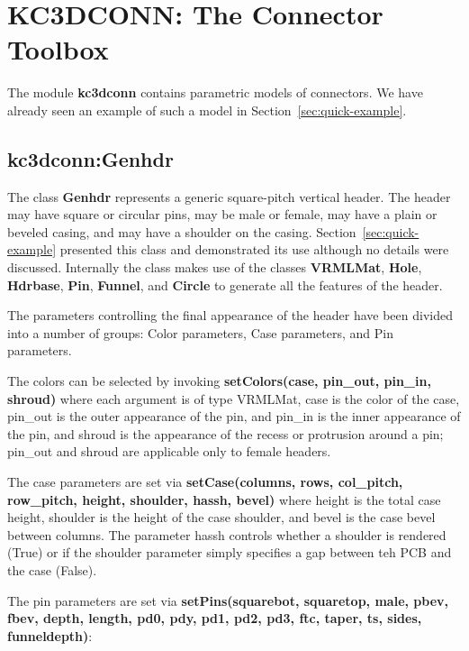 \section{KC3DCONN: The Connector Toolbox}
The module \textbf{kc3dconn} contains parametric models
of connectors.  We have already seen an example of such
a model in Section~\ref{sec:quick-example}.

\subsection{kc3dconn:Genhdr}
The class \textbf{Genhdr} represents a generic square-pitch vertical header.
The header may have square or circular pins, may be male or female, may
have a plain or beveled casing, and may have a shoulder on the casing.
Section~\ref{sec:quick-example} presented this class and demonstrated its
use although no details were discussed. Internally the class makes use of
the classes \textbf{VRMLMat}, \textbf{Hole}, \textbf{Hdrbase}, \textbf{Pin},
\textbf{Funnel}, and \textbf{Circle} to generate all the features of the
header.

The parameters controlling the final appearance of the header have been
divided into a number of groups: Color parameters, Case parameters, and
Pin parameters.

The colors can be selected by invoking \textbf{setColors(case, pin\_out, pin\_in, shroud)}
where each argument is of type VRMLMat, case is the color of the case, pin\_out is the outer
appearance of the pin, and pin\_in is the inner appearance of the pin, and shroud is the appearance of
the recess or protrusion around a pin; pin\_out and shroud are applicable only
to female headers.

The case parameters are set via \textbf{setCase(columns, rows, col\_pitch, row\_pitch, height, shoulder, hassh, bevel)}
where height is the total case height, shoulder is the height of the case shoulder, and bevel is the
case bevel between columns. The parameter hassh controls whether a shoulder is rendered (True) or if the shoulder
parameter simply specifies a gap between teh PCB and the case (False).

The pin parameters are set via
\textbf{setPins(squarebot, squaretop, male, pbev, fbev, depth, length, pd0, pdy, pd1, pd2, pd3, ftc, taper, ts, sides, funneldepth)}:

